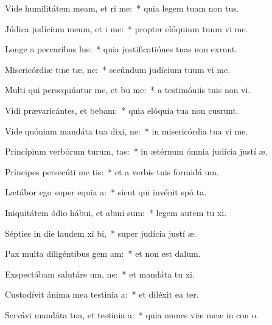 \item Vide humilitátem meam, et ri me:~* quia legem tuam non  tus.
\item Júdica judícium meum, et i me:~* propter elóquium tuum vi me.
\item Longe a peccaribus lus:~* quia justificatiónes tuas non exrunt.
\item Misericórdiæ tuæ tæ, ne:~* secúndum judícium tuum vi me.
\item Multi qui persequúntur me, et bu me:~* a testimóniis tuis non vi.
\item Vidi prævaricántes, et bebam:~* quia elóquia tua non cusrunt.
\item Vide quóniam mandáta tua dixi, ne:~* in misericórdia tua vi me.
\item Princípium verbórum turum, tas:~* in ætérnum ómnia judícia justí æ.
\item Príncipes persecúti  me tis:~* et a verbis tuis formidá  um.
\item Lætábor ego super equia a:~* sicut qui invénit spó ta.
\item Iniquitátem ódio hábui, et abmi sum:~* legem autem tu xi.
\item Sépties in die laudem xi bi,~* super judícia justí æ.
\item Pax multa diligéntibus gem am:~* et non est  dalum.
\item Exspectábam salutáre um, ne:~* et mandáta tu xi.
\item Custodívit ánima mea testinia a:~* et diléxit ea ter.
\item Servávi mandáta tua, et testinia a:~* quia omnes viæ meæ in con o.
